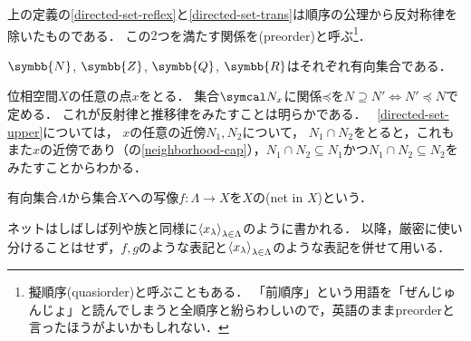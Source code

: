 \documentclass{ltjsbook}
\begin{document}
上の定義の\ref{directed-set-reflex}と\ref{directed-set-trans}は順序の公理から反対称律を除いたものである．
この\(2\)つを満たす関係を(preorder)と呼ぶ\footnote{%
擬順序(quasiorder)と呼ぶこともある．
「前順序」という用語を「ぜんじゅんじょ」と読んでしまうと全順序と紛らわしいので，英語のままpreorderと言ったほうがよいかもしれない．}．

\begin{example} \(\symbb{N}\), \(\symbb{Z}\), \(\symbb{Q}\), \(\symbb{R}\)はそれぞれ有向集合である．
\end{example}

\begin{example} 位相空間\(X\)の任意の点\(x\)をとる．
集合\(\Neighborhood{x}\)に関係\(\mathord{\preceq}\)を\(N \supseteq N' \Leftrightarrow N' \preceq N\)で定める．
これが反射律と推移律をみたすことは明らかである．
~\ref{directed-set-upper}については，
\(x\)の任意の近傍\(N_1, N_2\)について，
\(N_1 \cap N_2\)をとると，これもまた\(x\)の近傍であり（の\ref{neighborhood-cap}），\(N_1 \cap N_2 \subseteq N_1\)かつ\(N_1 \cap N_2 \subseteq N_2\)をみたすことからわかる．
\end{example}

\begin{thmbox}
\begin{definition}
有向集合\(\Lambda\)から集合\(X\)への写像\(f \colon \Lambda \to X\)を\(X\)の(net in \(X\))という．
\end{definition}
\end{thmbox}

ネットはしばしば列や族と同様に\({\langle {x}_\lambda \rangle}_{\lambda \in \Lambda}\)のように書かれる．
以降，厳密に使い分けることはせず，\(f, g\)のような表記と\({\langle {x}_\lambda \rangle}_{\lambda \in \Lambda}\)のような表記を併せて用いる．
\end{document}

